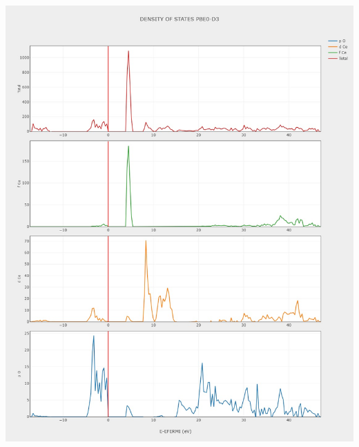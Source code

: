 \documentclass{article}
\begin{document}
\noindent\begin{minipage}{0.49\textwidth}
	\centering
	\includegraphics[width=1\textwidth]{../images/correct_band_and_dos/DOS PBE0-D3.jpeg}
    \label{fig:DOS_PBE0D3}
\end{minipage}
\hfill
\end{document}
